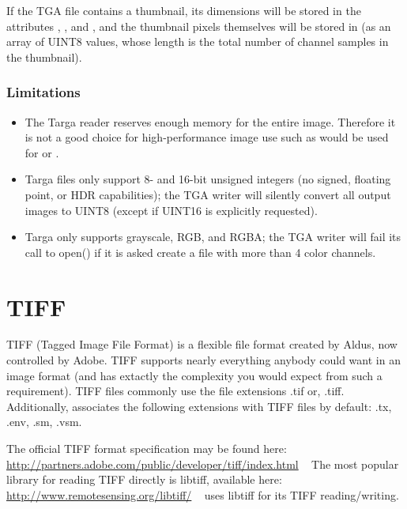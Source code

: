 If the TGA file contains a thumbnail, its dimensions will be
  stored in the attributes ,
  , and , and the
  thumbnail pixels themselves will be stored in 
  (as an array of UINT8 values, whose length is the total number of
  channel samples in the thumbnail).

\subsubsection*{Limitations}

\begin{itemize}
\item The Targa reader reserves enough memory for the entire image.
  Therefore it is not a good choice for high-performance image use such
  as would be used for \ImageCache or \TextureSystem.
\item Targa files only support 8- and 16-bit unsigned integers (no
  signed, floating point, or HDR capabilities); the \product TGA writer
  will silently convert all output images to UINT8 (except if UINT16 is
  explicitly requested).
\item Targa only supports grayscale, RGB, and RGBA; the \product TGA
  writer will fail its call to {\cf open()} if it is asked create a file
  with more than 4 color channels.
\end{itemize}


\vspace{.25in}

\section{TIFF}
\label{sec:bundledplugins:tiff}

TIFF (Tagged Image File Format) is a flexible file format created by
Aldus, now controlled by Adobe.  TIFF supports nearly everything anybody
could want in an image format (and has extactly the complexity you would
expect from such a requirement).
TIFF files commonly use the file extensions {\cf .tif} or, {\cf .tiff}.
Additionally, \product associates the following extensions with TIFF
files by default: {\cf .tx}, {\cf .env}, {\cf .sm}, {\cf .vsm}.

The official TIFF format specification may be found here:
\url{http://partners.adobe.com/public/developer/tiff/index.html}
~ The most popular library for reading TIFF directly is {\cf libtiff},
available here:
\url{http://www.remotesensing.org/libtiff/} ~ \product uses {\cf libtiff}
for its TIFF reading/writing.


